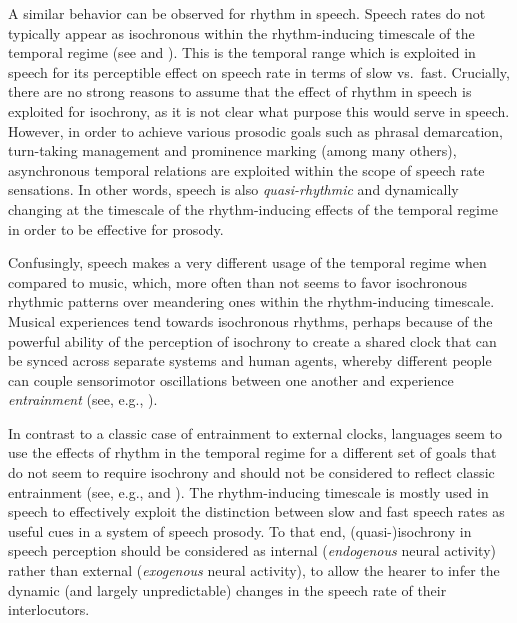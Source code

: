 A similar behavior can be observed for rhythm in speech. Speech rates do not typically appear as isochronous within the rhythm-inducing timescale of the temporal regime (see  \citealt{turk2013speechsk} and \citealt{nolan2014speechsk}). This is the temporal range which is exploited in speech for its perceptible effect on speech rate in terms of slow vs.~fast.
Crucially, there are no strong reasons to assume that the effect of rhythm in speech is exploited for isochrony, as it is not clear what purpose this would serve in speech.
However, in order to achieve various prosodic goals such as phrasal demarcation, turn-taking management and prominence marking (among many others), asynchronous temporal relations are exploited within the scope of speech rate sensations. In other words, speech is also \emph{quasi-rhythmic} and dynamically changing at the timescale of the rhythm-inducing effects of the temporal regime in order to be effective for prosody.

Confusingly, speech makes a very different usage of the temporal regime when compared to music, which, more often than not seems to favor isochronous rhythmic patterns over meandering ones within the rhythm-inducing timescale.
Musical experiences tend towards isochronous rhythms, perhaps because of the powerful ability of the perception of isochrony to create a shared clock that can be synced across separate systems and human agents, whereby different people can couple sensorimotor oscillations between one another and experience \emph{entrainment} (see, e.g., \citealt{cummins2009rhythm, cummins2015rhythm, benichov2016finding, haegens2018rhythmic, kotz2018evolution, rouse2016beat, tal2017neural}).

In contrast to a classic case of entrainment to external clocks, languages seem to use the effects of rhythm in the temporal regime for a different set of goals that do not seem to require isochrony and should not be considered to reflect classic entrainment (see, e.g., \citealt{cummins2012oscillators} and \citealt{meyer2019synchronous}).
The rhythm-inducing timescale is mostly used in speech to effectively exploit the distinction between slow and fast speech rates as useful cues in a system of speech prosody.
To that end, 
(quasi-)isochrony
in speech perception should be considered as internal (\textit{endogenous} neural activity) rather than external (\textit{exogenous} neural activity), to allow the hearer to infer the dynamic (and largely unpredictable) changes in the speech rate of their interlocutors.

